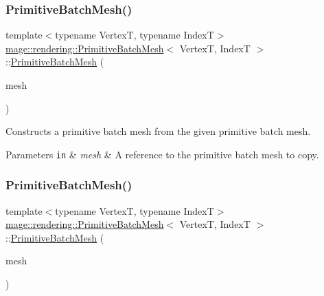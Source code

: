 \subsubsection{\texorpdfstring{Primitive\+Batch\+Mesh()}{PrimitiveBatchMesh()}\hspace{0.1cm}{\footnotesize\ttfamily [2/3]}}
{\footnotesize\ttfamily template$<$typename VertexT, typename IndexT$>$ \\
\hyperlink{classmage_1_1rendering_1_1_primitive_batch_mesh}{mage\+::rendering\+::\+Primitive\+Batch\+Mesh}$<$ VertexT, IndexT $>$\+::\hyperlink{classmage_1_1rendering_1_1_primitive_batch_mesh}{Primitive\+Batch\+Mesh} (\begin{DoxyParamCaption}\item[{const \hyperlink{classmage_1_1rendering_1_1_primitive_batch_mesh}{Primitive\+Batch\+Mesh}$<$ VertexT, IndexT $>$ \&}]{mesh }\end{DoxyParamCaption})\hspace{0.3cm}{\ttfamily [delete]}}

Constructs a primitive batch mesh from the given primitive batch mesh.


\begin{DoxyParams}[1]{Parameters}
\mbox{\tt in}  & {\em mesh} & A reference to the primitive batch mesh to copy. \\
\hline
\end{DoxyParams}
\hypertarget{classmage_1_1rendering_1_1_primitive_batch_mesh_ac46a8538b295cf4d85c7309d2bb4cdd5}{}\label{classmage_1_1rendering_1_1_primitive_batch_mesh_ac46a8538b295cf4d85c7309d2bb4cdd5} 
\subsubsection{\texorpdfstring{Primitive\+Batch\+Mesh()}{PrimitiveBatchMesh()}\hspace{0.1cm}{\footnotesize\ttfamily [3/3]}}
{\footnotesize\ttfamily template$<$typename VertexT, typename IndexT$>$ \\
\hyperlink{classmage_1_1rendering_1_1_primitive_batch_mesh}{mage\+::rendering\+::\+Primitive\+Batch\+Mesh}$<$ VertexT, IndexT $>$\+::\hyperlink{classmage_1_1rendering_1_1_primitive_batch_mesh}{Primitive\+Batch\+Mesh} (\begin{DoxyParamCaption}\item[{\hyperlink{classmage_1_1rendering_1_1_primitive_batch_mesh}{Primitive\+Batch\+Mesh}$<$ VertexT, IndexT $>$ \&\&}]{mesh }\end{DoxyParamCaption})\hspace{0.3cm}{\ttfamily [noexcept]}}

